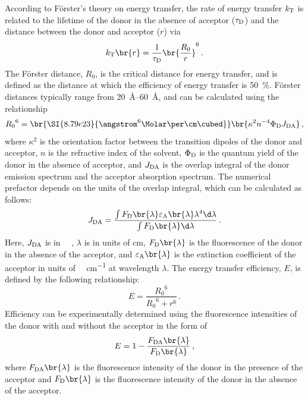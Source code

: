 \documentclass[nobib,nofonts,nols,nohyper]{tufte-handout}
\begin{document}
According to Förster’s theory on energy transfer, the rate of energy transfer \( k_{\textnormal{T}} \) is related to the lifetime of the donor in the absence of acceptor (\( \tau_{\textnormal{D}} \)) and the distance between the donor and acceptor (\( r \)) via
\begin{equation}
  k_\mtext{T}\br{r} = \frac{1}{\tau_\mtext{D}} \br{\frac{R_0}{r}}^6 \, .
\end{equation}
The Förster distance, \( R_0 \), is the critical distance for energy transfer, and is defined as the distance at which the efficiency of energy transfer is \SI{50}{\percent}. 
Förster distances typically range from \SIrange{20}{60}{\angstrom}, and can be calculated using the relationship
\begin{equation}
  {R_0}^6 = \br{\SI{8.79e23}{\angstrom^6\Molar\per\cm\cubed}}
              \br{\kappa^2 n^{-4} \Phi_\mtext{D} J_\mtext{DA}} \, ,
  \label{eq:forster_dist}
\end{equation}
where \( \kappa^2 \) is the orientation factor between the transition dipoles of the donor and acceptor, \( n \) is the refractive index of the solvent, \( \Phi_{\textnormal{D}} \) is the quantum yield of the donor in the absence of acceptor, and \( J_{\textnormal{DA}} \) is the overlap integral of the donor emission spectrum and the acceptor absorption spectrum. 
The numerical prefactor depends on the units of the overlap integral, which can be calculated as follows:
\begin{equation}
  J_\mtext{DA} = \frac{\int F_\mtext{D}\br{\lambda}
                       \varepsilon_\mtext{A}\br{\lambda} 
                       \lambda^4 \d\lambda}
                      {\int F_\mtext{D}\br{\lambda}\d\lambda} \, .
  \label{eq:overlap_int}
\end{equation}
Here, \( J_{\textnormal{DA}} \) is in \si{\per\Molar\cmc}, \( \lambda \) is in units of \si{\cm}, \( F_\mtext{D}\br{\lambda} \) is the fluorescence of the donor in the absence of the acceptor, and \( \varepsilon_\mtext{A}\br{\lambda} \) is the extinction coefficient of the acceptor in units of \si{\per\Molar\per\cm} at wavelength \( \lambda \). The energy transfer efficiency, \( E \), is defined by the following relationship:
\begin{equation}
  E = \frac{{R_0}^6}{{R_0}^6 + r^6} \, .
  \label{eq:dist_efficiency}
\end{equation}
Efficiency can be experimentally determined using the fluorescence intensities of the donor with and without the acceptor in the form of
\begin{equation}
  E = 1 - \frac{F_\mtext{DA}\br{\lambda}}{F_\mtext{D}\br{\lambda}} \, ,
  \label{eq:spec_efficiency}
\end{equation}
where \( F_\mtext{DA}\br{\lambda} \) is the fluorescence intensity of the donor in the presence of the acceptor and \( F_\mtext{D}\br{\lambda} \) is the fluorescence intensity of the donor in the absence of the acceptor. 
\end{document}
